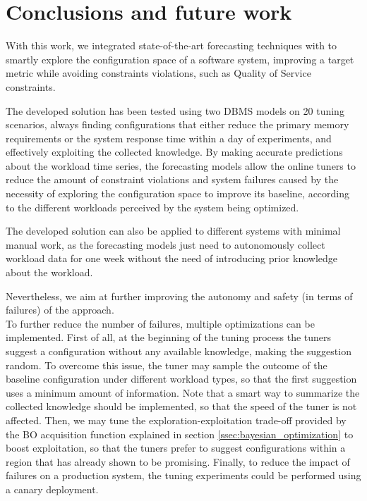 \documentclass[a4paper, 12pt]{article} %
\begin{document}
	\clearpage
	\section{ Conclusions and future work}
	With this work, we integrated state-of-the-art forecasting techniques with \cite{AkamasCGP} to smartly explore the configuration space of a software system, improving a target metric while avoiding constraints violations, such as Quality of Service constraints. 
	
	The developed solution has been tested using two DBMS models on 20 tuning scenarios, always finding configurations that either reduce the primary memory requirements or the system response time within a day of experiments, and effectively exploiting the collected knowledge. By making accurate predictions about the workload time series, the forecasting models allow the online tuners to reduce the amount of constraint violations and system failures caused by the necessity of exploring the configuration space to improve its baseline, according to the different workloads perceived by the system being optimized. 
	
	The developed solution can also be applied to different systems with minimal manual work, as the forecasting models just need to autonomously collect workload data for one week without the need of introducing prior knowledge about the workload.
	
	Nevertheless, we aim at further improving the autonomy and safety (in terms of failures) of the approach. \\	
	To further reduce the number of failures, multiple optimizations can be implemented. First of all, at the beginning of the tuning process the tuners suggest a configuration without any available knowledge, making the suggestion random. To overcome this issue, the tuner may sample the outcome of the baseline configuration under different workload types, so that the first suggestion uses a minimum amount of information. Note that a smart way to summarize the collected knowledge should be implemented, so that the speed of the tuner is not affected. Then, we may tune the exploration-exploitation trade-off provided by the BO acquisition function explained in section \ref{ssec:bayesian_optimization} to boost exploitation, so that the tuners prefer to suggest configurations within a region that has already shown to be promising. Finally, to reduce the impact of failures on a production system, the tuning experiments could be performed using a canary deployment.
	
\end{document}
